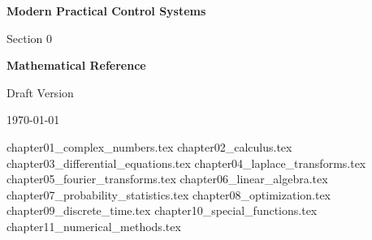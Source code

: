 \documentclass[11pt,letterpaper,openany]{book}
\begin{document}
\begin{titlepage}
\centering
\vspace*{3cm}

{\Huge\bfseries\color{chaptercolor} Modern Practical Control Systems \par}
\vspace{1cm}
{\Large Section 0 \par}
\vspace{0.5cm}
{\LARGE\bfseries Mathematical Reference \par}

\vspace{3cm}

{\Large \authorname \par}
\vspace{0.3cm}
{\large \authordepartment \par}
{\large \authorinstitution \par}

\vfill

{\large Draft Version \par}
{\large \today \par}
\end{titlepage}

\tableofcontents

{chapter01_complex_numbers.tex}
{chapter02_calculus.tex}
{chapter03_differential_equations.tex}
{chapter04_laplace_transforms.tex}
{chapter05_fourier_transforms.tex}
{chapter06_linear_algebra.tex}
{chapter07_probability_statistics.tex}
{chapter08_optimization.tex}
{chapter09_discrete_time.tex}
{chapter10_special_functions.tex}
{chapter11_numerical_methods.tex}
\end{document}
